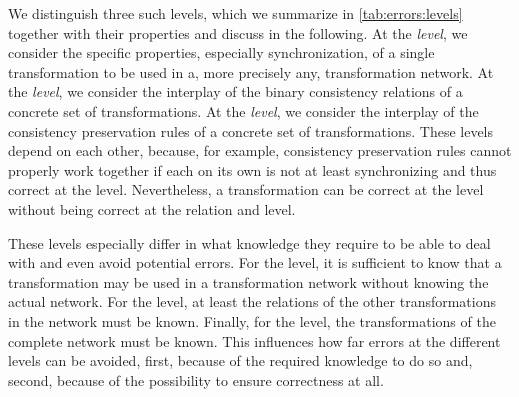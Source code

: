 We distinguish three such levels, which we summarize in \autoref{tab:errors:levels} together with their properties and discuss in the following.
%
At the \emph{\leveltransformation level}, we consider the specific properties, especially synchronization, of a single transformation to be used in a, more precisely any, transformation network.
At the \emph{\levelnetworkrelation level}, we consider the interplay of the binary consistency relations of a concrete set of transformations.
At the \emph{\levelnetworkrule level}, we consider the interplay of the consistency preservation rules of a concrete set of transformations.
These levels depend on each other, because, for example, consistency preservation rules cannot properly work together if each on its own is not at least synchronizing and thus correct at the \leveltransformation level.
Nevertheless, a transformation can be correct at the \leveltransformation level without being correct at the relation and \levelnetworkrule level.

These levels especially differ in what knowledge they require to be able to deal with and even avoid potential errors.
For the \leveltransformation level, it is sufficient to know that a transformation may be used in a transformation network without knowing the actual network.
For the \levelnetworkrelation level, at least the relations of the other transformations in the network must be known.
Finally, for the \levelnetworkrule level, the transformations of the complete network must be known.
This influences how far errors at the different levels can be avoided, first, because of the required knowledge to do so and, second, because of the possibility to ensure correctness at all.



